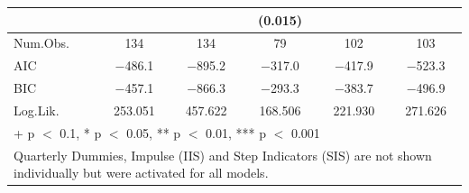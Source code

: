 \begin{table}
{\begin{tabular}[t]{lccccc}
 &  &  & (\num{0.015}) &  & \\
\midrule
Num.Obs. & \num{134} & \num{134} & \num{79} & \num{102} & \num{103}\\
AIC & \num{-486.1} & \num{-895.2} & \num{-317.0} & \num{-417.9} & \num{-523.3}\\
BIC & \num{-457.1} & \num{-866.3} & \num{-293.3} & \num{-383.7} & \num{-496.9}\\
Log.Lik. & \num{253.051} & \num{457.622} & \num{168.506} & \num{221.930} & \num{271.626}\\
\bottomrule
\multicolumn{6}{l}{\rule{0pt}{1em}+ p $<$ 0.1, * p $<$ 0.05, ** p $<$ 0.01, *** p $<$ 0.001}\\
\multicolumn{6}{l}{\rule{0pt}{1em}Quarterly Dummies, Impulse (IIS) and Step Indicators (SIS) are not shown individually but were activated for all models.}\\
\end{tabular}}
\end{table}

